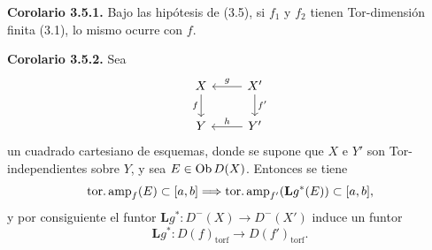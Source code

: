\textbf{Corolario 3.5.1.} Bajo las hipótesis de (3.5), si \(f_1\) y \(f_2\) tienen Tor-dimensión finita (3.1), lo mismo ocurre con \(f\).

\textbf{Corolario 3.5.2.} Sea
\[
\begin{tikzcd}
X \arrow[d,"f"'] & X' \arrow[l,"g"'] \arrow[d,"f'"]\\
Y & Y' \arrow[l,"h"']
\end{tikzcd}
\]
un cuadrado cartesiano de esquemas, donde se supone que \(X\) e \(Y'\) son Tor-independientes sobre \(Y\), y sea \(E\in\operatorname{Ob} D(X)\). Entonces se tiene
\[
  \operatorname{tor.amp}_f(E)\subset[a,b]\Longrightarrow
  \operatorname{tor.amp}_{f'}(\mathbf Lg^*(E))\subset[a,b],
\]
y por consiguiente el funtor \(\mathbf Lg^*:D^{-}(X)\to D^{-}(X')\) induce un funtor
\[
  \mathbf Lg^*:D(f)_{\mathrm{torf}}\longrightarrow D(f')_{\mathrm{torf}} .
\]
